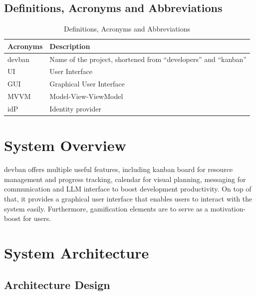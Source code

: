 \documentclass[11pt]{article}
\begin{document}
\subsection{Definitions, Acronyms and Abbreviations}
\begin{table}[h]
    \centering
    \caption{Definitions, Acronyms and Abbreviations}
    \begin{tabular}{p{2cm} p{12cm}}
        \toprule
        Acronyms
        & Description \\
        
        \midrule
        devban
        & Name of the project, shortened from ``developers'' and ``kanban'' \\

        \midrule
        UI
        & User Interface \\

        \midrule
        GUI
        & Graphical User Interface \\

        \midrule
        MVVM
        & Model-View-ViewModel \\

        \midrule
        idP
        & Identity provider \\
 
        \bottomrule
    \end{tabular}
    \label{tab:docs_definitions_acronyms_and_abbreviations}
\end{table}


\section{System Overview}

devban offers multiple useful features, including kanban board for resource management and
progress tracking, calendar for visual planning, messaging for communication and LLM interface
to boost development productivity. On top of that, it provides a graphical user interface that 
enables users to interact with the system easily. Furthermore, gamification elements are to serve
as a motivation-boost for users.

\section{System Architecture}

\subsection{Architecture Design}
\end{document}
